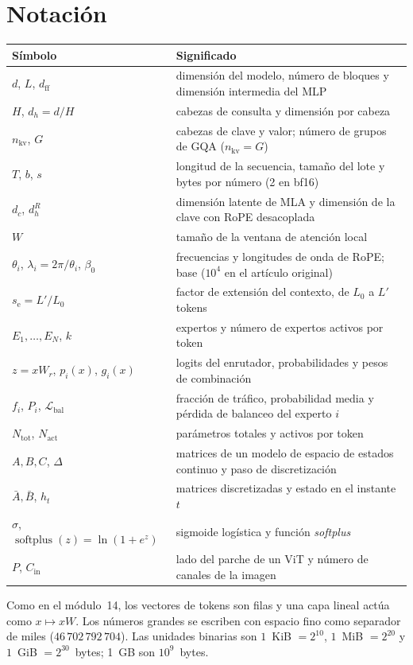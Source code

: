 \documentclass[11pt,a4paper,twoside,openany]{book}
\newcommand{\softplus}{\operatorname{softplus}}
\newcommand{\Lbal}{\mathcal{L}_{\mathrm{bal}}}
\newcommand{\dff}{d_{\mathrm{ff}}}
\newcommand{\dhd}{d_{h}}
\newcommand{\nkv}{n_{\mathrm{kv}}}
\newcommand{\dc}{d_{c}}
\newcommand{\Abar}{\bar{A}}
\newcommand{\Bbar}{\bar{B}}
\newcommand{\Nact}{N_{\mathrm{act}}}
\newcommand{\Ntot}{N_{\mathrm{tot}}}
\begin{document}
\section*{Notación}
\begin{center}\small
\begin{tabularx}{\textwidth}{@{}l>{\raggedright\arraybackslash}X@{}}
\toprule
Símbolo & Significado \\
\midrule
$d$, $L$, $\dff$ & dimensión del modelo, número de bloques y dimensión intermedia del MLP \\
$H$, $\dhd=d/H$ & cabezas de consulta y dimensión por cabeza \\
$\nkv$, $G$ & cabezas de clave y valor; número de grupos de GQA ($\nkv=G$) \\
$T$, $b$, $s$ & longitud de la secuencia, tamaño del lote y bytes por número (2 en bf16) \\
$\dc$, $d_h^{R}$ & dimensión latente de MLA y dimensión de la clave con RoPE desacoplada \\
$W$ & tamaño de la ventana de atención local \\
$\theta_i$, $\lambda_i=2\pi/\theta_i$, $\beta_0$ & frecuencias y longitudes de onda de RoPE; base ($10^{4}$ en el artículo original) \\
$s_{\mathrm{e}}=L'/L_0$ & factor de extensión del contexto, de $L_0$ a $L'$ tokens \\
$E_1,\dots,E_N$, $k$ & expertos y número de expertos activos por token \\
$z=xW_r$, $p_i(x)$, $g_i(x)$ & logits del enrutador, probabilidades y pesos de combinación \\
$f_i$, $P_i$, $\Lbal$ & fracción de tráfico, probabilidad media y pérdida de balanceo del experto $i$ \\
$\Ntot$, $\Nact$ & parámetros totales y activos por token \\
$A,B,C$, $\Delta$ & matrices de un modelo de espacio de estados continuo y paso de discretización \\
$\Abar,\Bbar$, $h_t$ & matrices discretizadas y estado en el instante $t$ \\
$\sigma$, $\softplus(z)=\ln(1+e^{z})$ & sigmoide logística y función \emph{softplus} \\
$P$, $C_{\mathrm{in}}$ & lado del parche de un ViT y número de canales de la imagen \\
\bottomrule
\end{tabularx}
\end{center}

Como en el módulo~14, los vectores de tokens son filas y una capa lineal actúa como $x\mapsto xW$. Los números grandes se escriben con espacio fino como separador de miles ($46\,702\,792\,704$). Las unidades binarias son $1$~KiB $=2^{10}$, $1$~MiB $=2^{20}$ y $1$~GiB $=2^{30}$~bytes; 1~GB son $10^{9}$~bytes.


\tableofcontents

\mainmatter







\backmatter

\end{document}
